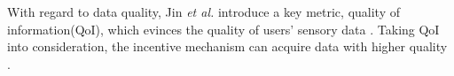 \documentclass[10pt,conference,compsocconf,letterpaper]{IEEEtran}
\begin{document}
With regard to data quality, %
Jin \emph{et al.} introduce a key metric, quality of information(QoI), which evinces the quality of users’ sensory data%
\cite{Jin2015Quality}. Taking QoI into consideration, the incentive mechanism can acquire data with higher quality \cite{Jin2015Quality}.%
\end{document}
